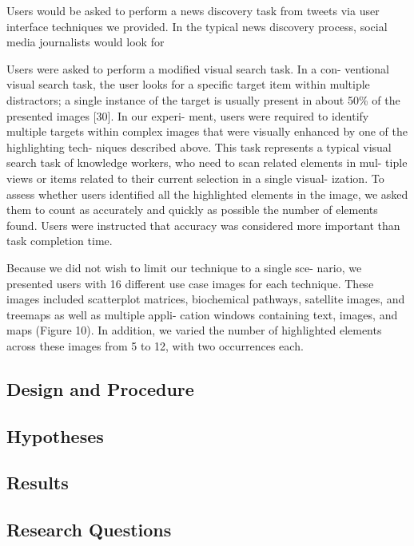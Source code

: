 Users would be asked to perform a news discovery task from tweets via user interface techniques we provided. In the typical news discovery process, social media journalists would look for 




Users were asked to perform a modiﬁed visual search task. In a con- ventional visual search task, the user looks for a speciﬁc target item within multiple distractors; a single instance of the target is usually present in about 50\% of the presented images [30]. In our experi- ment, users were required to identify multiple targets within complex images that were visually enhanced by one of the highlighting tech- niques described above. This task represents a typical visual search task of knowledge workers, who need to scan related elements in mul- tiple views or items related to their current selection in a single visual- ization. To assess whether users identiﬁed all the highlighted elements in the image, we asked them to count as accurately and quickly as possible the number of elements found. Users were instructed that accuracy was considered more important than task completion time.

Because we did not wish to limit our technique to a single sce- nario, we presented users with 16 different use case images for each technique. These images included scatterplot matrices, biochemical pathways, satellite images, and treemaps as well as multiple appli- cation windows containing text, images, and maps (Figure 10). In addition, we varied the number of highlighted elements across these images from 5 to 12, with two occurrences each.


\subsection{Design and Procedure}

\subsection{Hypotheses}

\subsection{Results}


\subsection{Research Questions}

